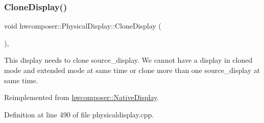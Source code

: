 \subsubsection{\texorpdfstring{Clone\+Display()}{CloneDisplay()}}
{\footnotesize\ttfamily void hwcomposer\+::\+Physical\+Display\+::\+Clone\+Display (\begin{DoxyParamCaption}\item[{\mbox{\hyperlink{classhwcomposer_1_1NativeDisplay}{Native\+Display}} $\ast$}]{ }\end{DoxyParamCaption})\hspace{0.3cm}{\ttfamily [override]}, {\ttfamily [virtual]}}

This display needs to clone source\+\_\+display. We cannot have a display in cloned mode and extended mode at same time or clone more than one source\+\_\+display at same time. 

Reimplemented from \mbox{\hyperlink{classhwcomposer_1_1NativeDisplay_ad244fa57c9c6380fb04bfd57da3cb28b}{hwcomposer\+::\+Native\+Display}}.



Definition at line 490 of file physicaldisplay.\+cpp.


